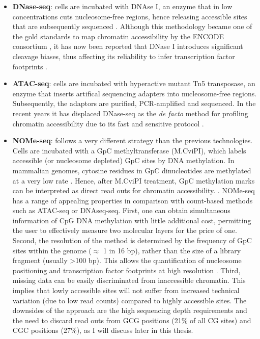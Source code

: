 \begin{itemize}

	\item \textbf{DNase-seq}: cells are incubated with DNAse I, an enzyme that in low concentrations cuts nucleosome-free regions, hence releasing accessible sites that are subsequently sequenced \cite{Song2010}. Although this methodology became one of the gold standards to map chromatin accessibility by the ENCODE consortium \cite{ENCODE2012,Thurman2012}, it has now been reported that DNase I introduces significant cleavage biases, thus affecting its reliability to infer transcription factor footprints \cite{He2013}.

	\item \textbf{ATAC-seq}: cells are incubated with hyperactive mutant Tn5 transposase, an enzyme that inserts artifical sequencing adapters into nucleosome-free regions. Subsequently, the adaptors are purified, PCR-amplified  and sequenced. In the recent years it has displaced DNase-seq as the \textit{de facto} method for profiling chromatin accessibility due to its fast and sensitive protocol \cite{Buenrostro2015b,Tsompana2014}.

	\item \textbf{NOMe-seq}: follows a very different strategy than the previous technologies. Cells are incubated with a GpC methyltransferase (M.CviPI), which labels accessible (or nucleosome depleted) GpC sites by DNA methylation. In mammalian genomes, cytosine residues in GpC dinucleotides are methylated at a very low rate \cite{Kilgore2007}. Hence, after M.CviPI treatment, GpC methylation marks can be interpreted as direct read outs for chromatin accessibility. \cite{Kelly2012}. NOMe-seq has a range of appealing properties in comparison with count-based methods such as ATAC-seq or DNAseq-seq. First, one can obtain simultaneous information of CpG DNA methylation with little additional cost, permitting the user to effectively measure two molecular layers for the price of one. Second, the resolution of the method is determined by the frequency of GpC sites within the genome ($\approx$ 1 in 16 bp), rather than the size of a library fragment (usually >100 bp). This allows the quantification of nucleosome positioning and transcription factor footprints at high resolution \cite{Kelly2012,Pott2016}. Third, missing data can be easily discriminated from inaccessible chromatin. This implies that lowly accessible sites will not suffer from increased technical variation (due to low read counts) compared to highly accessible sites. The downsides of the approach are the high sequencing depth requirements and the need to discard read outs from GCG positions (21\% of all CG sites) and CGC positions (27\%), as I will discuss later in this thesis.

\end{itemize}


